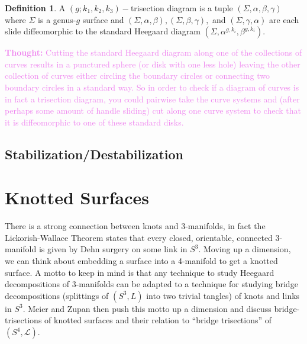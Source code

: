 \documentclass{amsart}
\def\thought#1{\textcolor{violet}{\textbf{Thought: }{#1}}}
\theoremstyle{definition}
\newtheorem{definition}[theorem]{Definition}
\begin{document}
\begin{definition}
A $(g; k_{1}, k_{2}, k_{3})-$trisection diagram is a tuple $(\Sigma, \alpha, \beta, \gamma)$ where $\Sigma$ is a genus-$g$ surface and $(\Sigma, \alpha, \beta),  (\Sigma, \beta, \gamma),$ and  $(\Sigma, \gamma, \alpha)$ are each slide diffeomorphic to the standard Heegaard diagram $(\Sigma, \alpha^{g, k_{i}}, \beta^{g, k_{i}}).$
\end{definition}

\thought{Cutting the standard Heegaard diagram along one of the collections of curves results in a punctured sphere (or disk with one less hole) leaving the other collection of curves either circling the boundary circles or connecting two boundary circles in a standard way. So in order to check if a diagram of curves is in fact a trisection diagram, you could pairwise take the curve systems and (after perhaps some amount of handle sliding) cut along one curve system to check that it is diffeomorphic to one of these standard disks.}


\subsection{Stabilization/Destabilization}

\section{Knotted Surfaces}
There is a strong connection between knots and 3-manifolds, in fact the Lickorish-Wallace Theorem states that every closed, orientable, connected 3-manifold is given by Dehn surgery on some link in $S^{3}.$ Moving up a dimension, we can think about embedding a surface into a 4-manifold to get a knotted surface. A motto to keep in mind is that any technique to study Heegaard decompositions of 3-manifolds can be adapted to a technique for studying bridge decompositions (splittings of $(S^{3}, L)$ into two trivial tangles) of knots and links in $S^{3}.$ Meier and Zupan then push this motto up a dimension and discuss bridge-trisections of knotted surfaces and their relation to ``bridge trisections'' of $(S^{4}, \mathcal{L})$.
\end{document}

